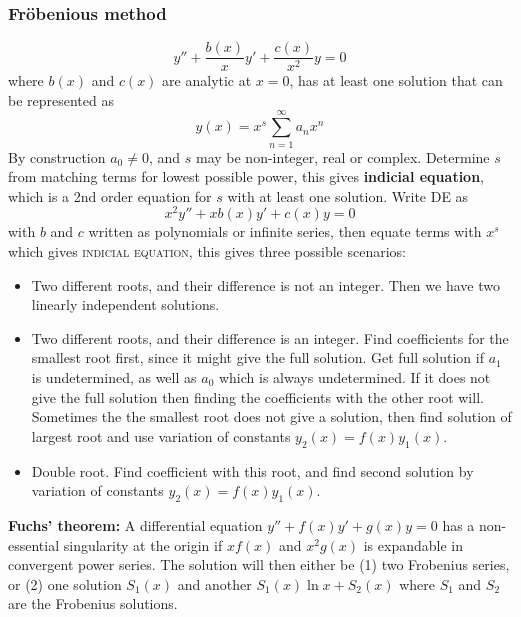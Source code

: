 \documentclass[a4paper, 10pt]{article}
\begin{document}
\begin{multicols*}{3}
\subsubsection*{\small Fröbenious method}
$$y'' + \frac{b(x)}{x}y' + \frac{c(x)}{x^2}y = 0 $$
where $b(x)$ and $c(x)$ are analytic at $x=0$, has at least one solution that can be represented as
$$y(x) = x^s \sum_{n=1}^{\infty} a_n x^n$$
By construction $a_0 \neq 0$, and $s$ may be non-integer, real or complex.
Determine $s$ from matching terms for lowest possible power, this gives \textbf{indicial equation}, which is a 2nd order equation for $s$ with at least one solution. Write DE as
$$ x^2y'' + xb(x)y' + c(x)y = 0$$
with $b$ and $c$ written as polynomials or infinite series, then equate terms with $x^s$ which gives \textsc{indicial equation}, this gives three possible scenarios:
\begin{itemize}
  \item Two different roots, and their difference is not an integer. Then we have two linearly independent solutions.
  \item Two different roots, and their difference is an integer. Find coefficients for the smallest root first, since it might give the full solution. Get full solution if $a_1$ is undetermined, as well as $a_0$ which is always undetermined. If it does not give the full solution then finding the coefficients with the other root will. Sometimes the the smallest root does not give a solution, then find solution of largest root and use variation of constants $y_2(x) = f(x)y_1(x)$.
  \item Double root. Find coefficient with this root, and find second solution by variation of constants $y_2(x) = f(x)y_1(x)$.
\end{itemize}

\textbf{Fuchs' theorem:}
A differential equation $y'' + f(x)y' + g(x)y = 0$ has a non-essential singularity at the origin if $xf(x)$ and $x^2g(x)$ is expandable in convergent power series. The solution will then either be (1) two Frobenius series, or (2) one solution $S_1(x)$ and another $S_1(x)\ln{x}+S_2(x)$ where $S_1$ and $S_2$ are the Frobenius solutions.
\newpage
\begin{mdframed}

\end{mdframed}
\end{multicols*}
\end{document}
